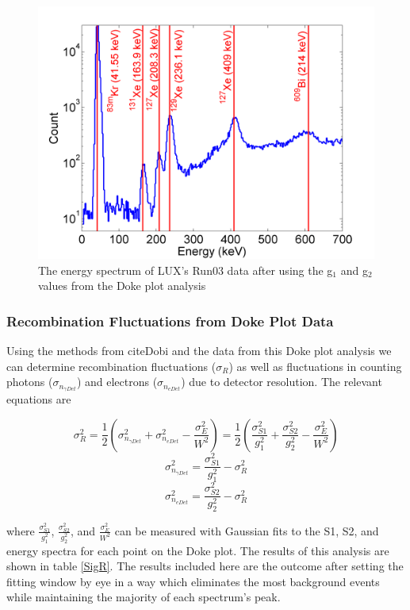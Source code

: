 \documentclass[a4paper,12pt]{article}
\begin{document}
{%
\begin{figure}[H]
\centering
\includegraphics[scale=0.4]{WS_Spectrum.png}
\caption{The energy spectrum of LUX's Run03 data after using the g$_1$ and g$_2$ values from the Doke plot analysis}
\label{Run03EnergySpectrum}
\end{figure}


\newpage 

\subsubsection{Recombination Fluctuations from Doke Plot Data}

Using the methods from cite{Dobi} and the data from this Doke plot analysis we can determine recombination fluctuations ($\sigma_{R}$) as well as fluctuations in counting photons ($\sigma_{n_{\gamma Det}}$) and electrons ($\sigma_{n_{e Det}}$) due to detector resolution.  The relevant equations are

\[\sigma_{R}^2 = \frac{1}{2}( \sigma_{n_{\gamma Det}}^2 + \sigma_{n_{e Det}}^2 - \frac{\sigma_{E}^2}{W^2}) = \frac{1}{2}(\frac{\sigma_{S1}^2}{g_{1}^2} + \frac{\sigma_{S2}^2}{g_{2}^2} - \frac{\sigma_{E}^2}{W^2}) \]
\[ \sigma_{n_{\gamma Det}}^2 = \frac{\sigma_{S1}^2}{g_{1}^2} - \sigma_{R}^2 \]
\[ \sigma_{n_{e Det}}^2 = \frac{\sigma_{S2}^2}{g_{2}^2} - \sigma_{R}^2 \]


where $\frac{\sigma_{S1}^2}{g_{1}^2}$, $\frac{\sigma_{S2}^2}{g_{2}^2}$, and $\frac{\sigma_{E}^2}{W^2}$ can be measured with Gaussian fits to the S1, S2, and energy spectra for each point on the Doke plot.  The results of this analysis are shown in table \ref{SigR}.  The results included here are the outcome after setting the fitting window by eye in a way which eliminates the most background events while maintaining the majority of each spectrum's peak.  

}
\end{document}
